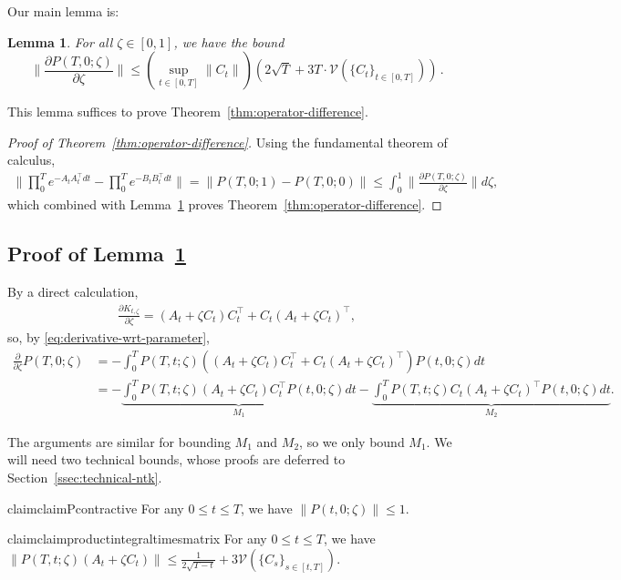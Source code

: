 \documentclass[11pt]{article} %
\newcommand{\<}{\langle}
\renewcommand{\>}{\rangle}
\def\cV{{\mathcal V}}
\def\cV{{\mathcal V}}
\def\cV{{\mathcal V}}
\newcommand{\pd}[2]{\frac{\partial #1}{\partial #2}}
\theoremstyle{plain}
\newtheorem{lemma}[theorem]{Lemma}
\theoremstyle{definition}
\theoremstyle{remark}
\begin{document}
Our main lemma is:
\begin{lemma}For all $\zeta \in [0,1]$, we have the bound $$\|\pd{P(T,0;\zeta)}{\zeta}\| \leq (\sup_{t \in [0,T]} \|C_t\|) (2\sqrt{T} + 3 T \cdot \cV(\{C_t\}_{t \in [0,T]}))\,.$$\label{lem:derivative-bound}
\end{lemma}

This lemma suffices to prove Theorem~\ref{thm:operator-difference}.
\begin{proof}[Proof of Theorem~\ref{thm:operator-difference}]
Using the fundamental theorem of calculus,
\begin{align*}
\|\prod_{0}^T e^{-A_tA_t^{\top} dt} - \prod_{0}^T e^{-B_tB_t^{\top} dt}\| = \|P(T,0;1) - P(T,0;0)\| \leq \int_{0}^1 \|\frac{\partial P(T,0;\zeta)}{\partial \zeta}\| d\zeta,
\end{align*}
which combined with Lemma~\ref{lem:derivative-bound} proves Theorem~\ref{thm:operator-difference}.
\end{proof}

\subsection{Proof of Lemma~\ref{lem:derivative-bound}}
By a direct calculation,
\begin{align*}
\pd{K_{t,\zeta}}{\zeta} = (A_t + \zeta C_t) C_t^{\top} + C_t (A_t + \zeta C_t)^{\top},
\end{align*}
so, by \eqref{eq:derivative-wrt-parameter},
\begin{align*}
\pd{}{ \zeta } P(T,0; \zeta) &= -\int_{0}^T P(T,t; \zeta) ((A_t + \zeta C_t) C_t^{\top} + C_t (A_t + \zeta C_t)^{\top}) P(t,0; \zeta) dt \\
&= -\underbrace{\int_{0}^T P(T,t; \zeta) (A_t + \zeta C_t) C_t^{\top} P(t,0; \zeta) dt}_{M_1} - \underbrace{\int_{0}^T P(T,t; \zeta) C_t (A_t + \zeta C_t)^{\top} P(t,0; \zeta) dt}_{M_2}.
\end{align*}

The arguments are similar for bounding $M_1$ and $M_2$, so we only bound $M_1$. We will need two technical bounds, whose proofs are deferred to Section~\ref{ssec:technical-ntk}.

\begin{restatable}{claim}{claimPcontractive}\label{claim:P-contractive}
For any $0 \leq t \leq T$, we have
$\|P(t,0; \zeta )\| \leq 1$.
\end{restatable}


\begin{restatable}{claim}{claimproductintegraltimesmatrix}\label{claim:time-dependent-expminusasquaredtimesa}
For any $0\leq t \leq T$, we have $\|P(T,t; \zeta) (A_t +  \zeta  C_t)\| \leq \frac{1}{2\sqrt{T-t}} + 3 \cV(\{C_s\}_{s \in [t,T]})$.
\end{restatable}
\end{document}
